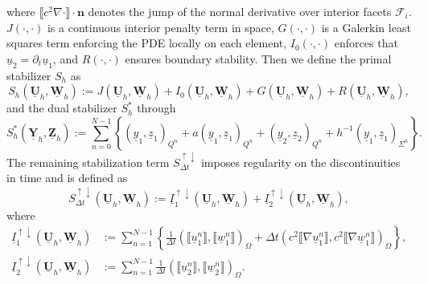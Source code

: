 \documentclass[sn-mathphys-num]{sn-jnl}
\numberwithin{equation}{section}
\newcommand{\jump}[1]{\llbracket#1\rrbracket}
\newcommand{\Uh}{\underline{\mathbf{U}}_h}
\newcommand{\Yh}{\underline{\mathbf{Y}}_h}
\newcommand{\Zh}{\underline{\mathbf{Z}}_h}
\newcommand{\Wh}{\underline{\mathbf{W}}_h}
\newcommand{\ul}{\underline{u}}
\newcommand{\yl}{\underline{y}}
\newcommand{\zl}{\underline{z}}
\newcommand{\wl}{\underline{w}}
\newcommand{\Sud}{S^{\uparrow \downarrow}_{\Delta t}}
\newcommand{\dt}{\partial_t}
\begin{document}
where $\jump{c^2 \nabla \cdot} \cdot \mathbf{n}$  denotes the jump of the normal derivative over interior facets $\mathcal{F}_i$.
$J(\cdot,\cdot)$ is a continuous interior penalty term in space, $G(\cdot,\cdot)$ is a Galerkin least squares term enforcing the PDE locally on each element, $I_0(\cdot,\cdot)$ enforces that $\ul_2 = \dt \ul_1$, and $R(\cdot,\cdot)$ ensures boundary stability. 
Then we define the primal stabilizer $S_h$ as 
\begin{equation}\label{eq:primalStab}
    S_h(\Uh,\Wh) := J(\Uh,\Wh) + I_0(\Uh,\Wh) + G(\Uh,\Wh) + R(\Uh,\Wh), 
\end{equation}
and the dual stabilizer $S_h^\ast$ through 
\begin{equation}
    S_h^\ast(\Yh,\Zh) := \sum_{n = 0}^{N-1} \left\{ (\yl_1,\zl_1)_{Q^n} + a(\yl_1,\zl_1)_{Q^n} + (\yl_2,\zl_2)_{Q^n} + h^{-1} (\yl_1,\zl_1)_{\Sigma^n} \right\}.
\end{equation}
The remaining stabilization term $\Sud$ imposes regularity on the discontinuities in time and is defined as 
\begin{equation}
    \Sud (\Uh,\Wh) := \underline{I}_1^{\uparrow \downarrow}(\Uh,\Wh) + \underline{I}_2^{\uparrow \downarrow}(\Uh,\Wh),
\end{equation}
where 
\begin{align*}
    \underline{I}_1^{\uparrow \downarrow}(\Uh,\Wh) &:= \sum_{n = 1}^{N-1} \left\{ \frac{1}{\Delta t} (\jump{\ul_1^n},\jump{\wl_1^n})_{\Omega} + \Delta t (c^2 \jump{\nabla \ul_1^n},c^2 \jump{\nabla \wl_1^n})_{\Omega}\right\}, \\
    \underline{I}_2^{\uparrow \downarrow}(\Uh,\Wh) &:= \sum_{n = 1}^{N-1} \frac{1}{\Delta t} (\jump{\ul_2^n},\jump{\wl_2^n})_{\Omega}.
\end{align*}
\end{document}
